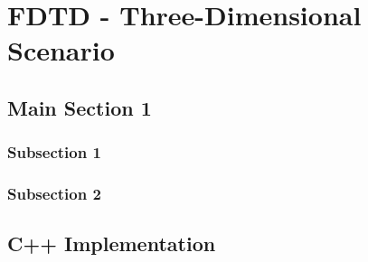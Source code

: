 
\chapter{FDTD - Three-Dimensional Scenario} %

\label{Chapter4} %


\section{Main Section 1}


\subsection{Subsection 1}



\subsection{Subsection 2}


\section{C++ Implementation}

